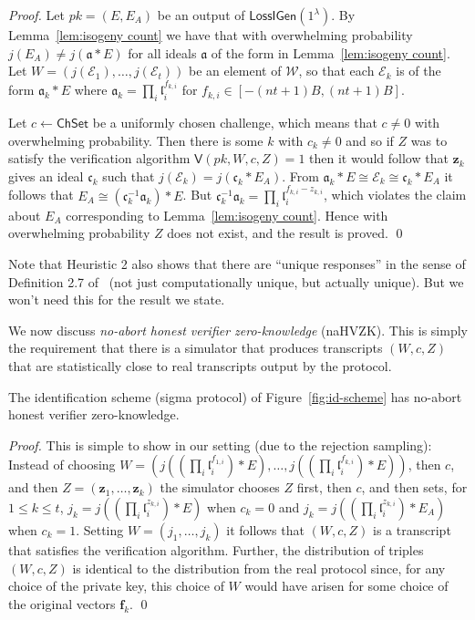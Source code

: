\documentclass{llncs}
\newcommand{\E}{\mathcal{E}}
\renewcommand{\a}{\mathfrak{a}}
\renewcommand{\c}{\mathfrak{c}}
\renewcommand{\l}{\mathfrak{l}}
\newcommand{\f}{\mathbf{f}}
\newcommand{\z}{\mathbf{z}}
\newcommand{\VV}{\mathsf{V}}
\newcommand{\Wset}{\mathcal{W}}
\newcommand{\ChSet}{\textsf{ChSet}}
\newcommand{\LossIGen}{\mathsf{LossIGen}}
\begin{document}
\begin{proof}
Let $pk = (E, E_A )$ be an output of $\LossIGen( 1^\lambda )$.
By Lemma~\ref{lem:isogeny count} we have that with overwhelming probability $j(E_A) \ne j( \a * E )$ for all ideals $\a$ of the form in Lemma~\ref{lem:isogeny count}.
Let $W = (j(\E_1), \dots, j(\E_t) )$ be an element of $\Wset$, so that each $\E_k$ is of the form $\a_k * E$ where $\a_k = \prod_i \l_i^{f_{k,i}}$ for $f_{k,i} \in [-(nt+1)B, (nt+1)B ]$.


Let $c \leftarrow \ChSet$ be a uniformly chosen challenge, which means that $c \ne 0$ with overwhelming probability.
Then there is some $k$ with $c_k \ne 0$ and so if $Z$ was to satisfy the verification algorithm
$\VV( pk, W, c, Z ) = 1$ then it would follow that $\z_k$ gives an ideal $\c_k$ such that $j(\E_k) = j( \c_k * E_A )$.
From $\a_k * E  \cong \E_k \cong \c_k * E_A$ it follows that $E_A \cong (\c_k^{-1} \a_k ) * E$.
But $\c_k^{-1} \a_k = \prod_i \l_i^{f_{k,i} - z_{k,i}}$, which violates the claim about $E_A$ corresponding to Lemma~\ref{lem:isogeny count}. Hence with overwhelming probability $Z$ does not exist, and the result is proved. \qed
\end{proof}


Note that Heuristic 2 also shows that there are ``unique responses'' in the sense of Definition 2.7 of~\cite{KLS18} (not just computationally unique, but actually unique). But we won't need this for the result we state.


We now discuss \emph{no-abort honest verifier zero-knowledge} (naHVZK).
This is simply the requirement that there is a simulator that produces transcripts $(W,c,Z)$ that are statistically close to real transcripts output by the protocol.


\begin{lemma}
The identification scheme (sigma protocol) of Figure~\ref{fig:id-scheme} has no-abort honest verifier zero-knowledge.
\end{lemma}

\begin{proof}
This is simple to show in our setting (due to the rejection sampling): Instead of choosing $W = ( j( (\prod_i \l_i^{f_{1,i}}) * E) , \dots, j( ( \prod_i \l_i^{f_{k,i}}) * E ))$, then $c$, and then $Z = (\z_1, \dots, \z_k)$ the simulator chooses $Z$ first, then $c$, and then sets, for $1 \le k \le t$, $j_k = j( (\prod_i \l_i^{z_{k,i}}) * E )$ when $c_k=0$ and $j_k = j( (\prod_i \l_i^{z_{k,i}} ) * E_A )$ when $c_k = 1$.
Setting $W = (j_1,\dots, j_k)$ it follows that $(W, c, Z )$ is a transcript that satisfies the verification algorithm.
Further, the distribution of triples $(W,c,Z)$ is identical to the distribution from the real protocol since, for any choice of the private key, this choice of $W$ would have arisen for some choice of the original vectors $\f_k$. \qed
\end{proof}
\end{document}
